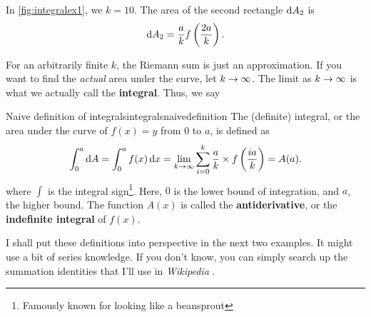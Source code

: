 In \cref{fig:integralex1}, we  $k = 10$. The area of the second rectangle $\odif{A_2}$ is
\begin{equation*}
    \odif{A_2} = \frac{a}{k}f\left(\frac{2a}{k}\right).    
\end{equation*}

For an arbitrarily finite $k$, the Riemann sum is just an approximation. If you want to find the \textit{actual} area under the curve, let $k \rightarrow \infty$. The limit as $k \rightarrow \infty$ is what we actually call the \textbf{integral}. Thus, we say
\begin{df}{Naive definition of integrals}{integralsnaivedefinition}
    The (definite) integral, or the area under the curve of $f(x) = y$ from $0$ to $a$, is defined as
    \begin{equation}
        \int_{0}^{a}\odif{A} = \int_{0}^{a}f(x)\odif{x} = \lim_{k \appr \infty}\sum_{i = 0}^{k}\frac{a}{k} \times f\left(\frac{ia}{k}\right) = A(a).
    \end{equation}
    where $\int$ is the integral sign\footnote{Famously known for looking like a beansprout}. Here, $0$ is the lower bound of integration, and $a$, the higher bound. The function $A(x)$ is called the \textbf{antiderivative}, or the \textbf{indefinite integral} of $f(x)$.
\end{df}

I shall put these definitions into perspective in the next two examples. It might use a bit of series knowledge. If you don't know, you can simply search up the summation identities that I'll use in \emph{Wikipedia} \cite{wikipedia-summation}.


